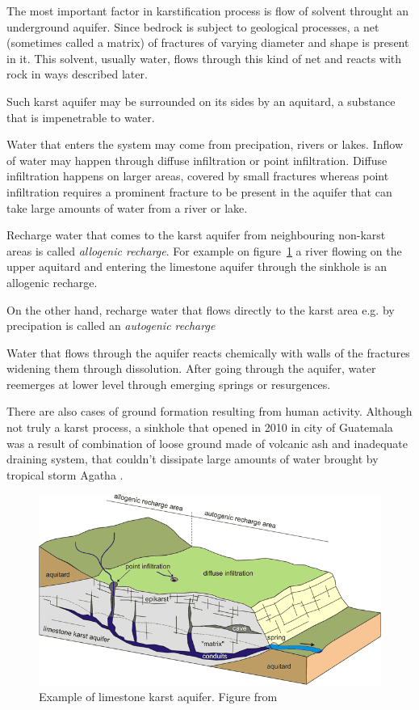 The most important factor in karstification process is flow of solvent throught an
underground aquifer. Since bedrock is subject to geological processes, a
net (sometimes called a matrix) of fractures of varying diameter and shape is
present in it. This solvent, usually water, flows through this kind of net and
reacts with rock in ways described later.

Such karst aquifer may be surrounded on its sides by an aquitard, a substance
that is impenetrable to water.

Water that enters the system may come from precipation, rivers or lakes. Inflow
of water may happen through diffuse infiltration or point infiltration.
Diffuse infiltration happens on larger areas, covered by small fractures whereas
point infiltration requires a prominent fracture to be present in the aquifer
that can take large amounts of water from a river or lake.

Recharge water that comes to the karst aquifer from neighbouring non-karst areas
is called \emph{allogenic recharge}. For example on figure~\ref{fig:karstification}
a river flowing on the upper aquitard and entering the limestone aquifer through
the sinkhole is an allogenic recharge.

On the other hand, recharge water that flows directly to the karst area e.g. by
precipation is called an \emph{autogenic recharge}

Water that flows through the aquifer reacts chemically with walls of the
fractures widening them through dissolution. After going through the aquifer,
water reemerges at lower level through emerging springs or resurgences.

There are also cases of ground formation resulting from human activity.
Although not truly a karst process, a sinkhole that opened in 2010 in city of
Guatemala was a result of combination of loose ground made of volcanic ash and
inadequate draining system, that couldn't dissipate large amounts of water
brought by tropical storm Agatha \parencite{times2010}.

\begin{figure}
  \centerline{\includegraphics[width=\textwidth]{chapters/karstification/karstification.png}}
  \caption{Example of limestone karst aquifer.
    Figure from \cite{golscheider2007methods}}
  \label{fig:karstification}
\end{figure}

